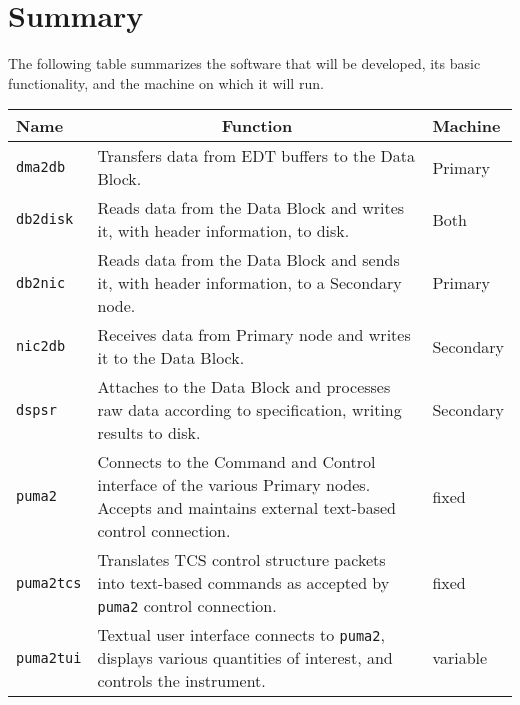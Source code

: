 \chapter{Summary}

The following table summarizes the software that will be developed,
its basic functionality, and the machine on which it will run.

\vspace{5mm}

\begin{tabular}{l|p{8cm}|l}

Name & \multicolumn{1}{c}{Function} & Machine \\ \hline

{\tt dma2db} & Transfers data from EDT buffers to the Data Block.
	& Primary \\

{\tt db2disk} & Reads data from the Data Block and writes it, with
	header information, to disk. & Both \\

{\tt db2nic} & Reads data from the Data Block and sends it, with
	header information, to a Secondary node. & Primary \\

{\tt nic2db} & Receives data from Primary node and writes it to the 
	Data Block. & Secondary \\

{\tt dspsr} & Attaches to the Data Block and processes raw data
	according to specification, writing results to disk. &
	Secondary \\

{\tt puma2} & Connects to the Command and Control interface of the
	various Primary nodes.  Accepts and maintains external
	text-based control connection.  & fixed \\

{\tt puma2tcs} & Translates TCS control structure packets into
	text-based commands as accepted by {\tt puma2} control
	connection. & fixed \\

{\tt puma2tui} & Textual user interface connects to {\tt puma2},
	displays various quantities of interest, and controls
	the instrument. & variable \\

\end{tabular}

